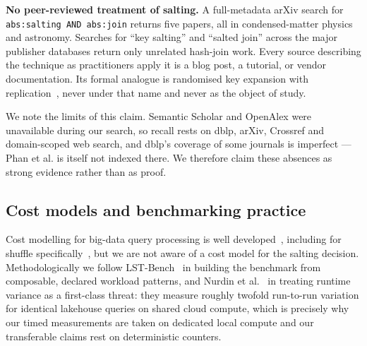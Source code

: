 \textbf{No peer-reviewed treatment of salting.} A full-metadata arXiv search
for \texttt{abs:salting AND abs:join} returns five papers, all in
condensed-matter physics and astronomy. Searches for ``key salting'' and
``salted join'' across the major publisher databases return only unrelated
hash-join work. Every source describing the technique as practitioners apply it
is a blog post, a tutorial, or vendor documentation. Its formal analogue is
randomised key expansion with replication~\cite{metwally2025amjoin,
dewitt1992skew}, never under that name and never as the object of study.

We note the limits of this claim. Semantic Scholar and OpenAlex were
unavailable during our search, so recall rests on dblp, arXiv, Crossref and
domain-scoped web search, and dblp's coverage of some journals is imperfect ---
Phan et al. is itself not indexed there. We therefore claim these absences as
strong evidence rather than as proof.

\subsection{Cost models and benchmarking practice}

Cost modelling for big-data query processing is well
developed~\cite{siddiqui2020costmodels, zhou2010scopeopt, leis2021costoptimal},
including for shuffle specifically~\cite{shen2020magnet}, but we are not aware
of a cost model for the salting decision. Methodologically we follow
LST-Bench~\cite{camacho2024lstbench} in building the benchmark from composable,
declared workload patterns, and Nurdin et al.~\cite{nurdin2026lakehouseperf} in
treating runtime variance as a first-class threat: they measure roughly
twofold run-to-run variation for identical lakehouse queries on shared cloud
compute, which is precisely why our timed measurements are taken on dedicated
local compute and our transferable claims rest on deterministic counters.
